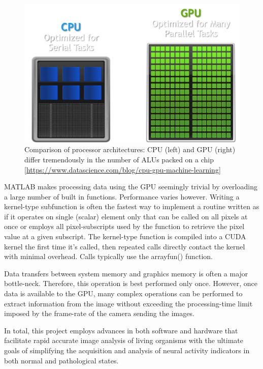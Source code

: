 \begin{figure}[b]
\centering
\includegraphics[width=\linewidth]{figures/cpu_vs_gpu.png}
\caption[Comparison of processor architectures]{Comparison of processor architectures: CPU (left) and GPU (right) differ tremendously in the number of ALUs packed on a chip [\url{https://www.datascience.com/blog/cpu-gpu-machine-learning}]}
\label{fig:gpu-comparison}
\end{figure}

MATLAB makes processing data using the GPU seemingly trivial by overloading a large number of built in functions.
Performance varies however.
Writing a kernel-type subfunction is often the fastest way to implement a routine written as if it operates on single (scalar) element only that can be called on all pixels at once or employs all pixel-subscripts used by the function to retrieve the pixel value at a given subscript.
The kernel-type function is compiled into a CUDA kernel the first time it's called, then repeated calls directly contact the kernel with minimal overhead.
Calls typically use the arrayfun() function.

Data transfers between system memory and graphics memory is often a major bottle-neck.
Therefore, this operation is best performed only once.
However, once data is available to the GPU, many complex operations can be performed to extract information from the image without exceeding the processing-time limit imposed by the frame-rate of the camera sending the images.

In total, this project employs advances in both software and hardware that facilitate rapid accurate image analysis of living organisms with the ultimate goals of simplifying the acquisition and analysis of neural activity indicators in both normal and pathological states.


% 

\cleardoublepage{}
